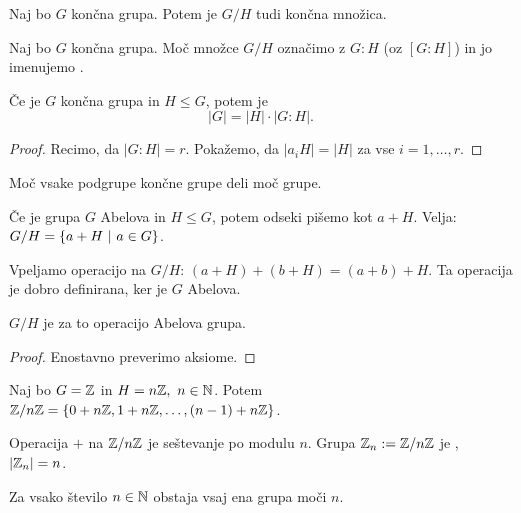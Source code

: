 \begin{opomba}
    Naj bo $G$ končna grupa. Potem je $G/H$ tudi končna množica.
\end{opomba}

\begin{definicija}
    Naj bo $G$ končna grupa. Moč množce $G/H$ označimo z $G:H$ (oz $[G:H]$) in jo imenujemo .
\end{definicija}

\begin{izrek}
    Če je $G$ končna grupa in $H \leq G$, potem je 
    $$|G| = |H| \cdot |G:H|.$$
\end{izrek}

\begin{proof}
    Recimo, da $|G:H| = r$. Pokažemo, da $|a_iH| = |H|$ za vse $i = 1, \ldots, r$.
\end{proof}

\begin{posledica}
    Moč vsake podgrupe končne grupe deli moč grupe.
\end{posledica}

\begin{opomba}
    Če je grupa $G$ Abelova in $H \leq G$, potem odseki pišemo kot $a + H$. Velja: $G/H = \left\{a+H \ | \ a \in G\right\}$.

    Vpeljamo operacijo na $G/H$: $(a+H) + (b+H) = (a + b) + H$. Ta operacija je dobro definirana, ker je $G$ Abelova.
\end{opomba}

\begin{trditev}
    $G/H$ je za to operacijo Abelova grupa.
\end{trditev}

\begin{proof}
    Enostavno preverimo aksiome.
\end{proof}

\begin{primer}
    Naj bo $G = \mathbb{Z}$ in $H = n\mathbb{Z}, \ n \in \mathbb{N}$. Potem $\mathbb{Z}/{n\mathbb{Z}} = \left\{0 + n\mathbb{Z}, 1 + n\mathbb{Z}, \ldots, (n-1) + n\mathbb{Z}\right\}$.

    Operacija $+$ na $\mathbb{Z}/{n\mathbb{Z}}$ je seštevanje po modulu $n$. Grupa $\mathbb{Z}_n := \mathbb{Z}/{n\mathbb{Z}}$ je , $|\mathbb{Z}_n| = n$.
\end{primer}
\begin{posledica}
    Za vsako število $n \in \mathbb{N}$ obstaja vsaj ena grupa moči $n$.
\end{posledica}

\newpage

